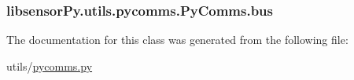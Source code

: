 \subsubsection[{bus}]{\setlength{\rightskip}{0pt plus 5cm}libsensor\+Py.\+utils.\+pycomms.\+Py\+Comms.\+bus}\label{classlibsensorPy_1_1utils_1_1pycomms_1_1PyComms_a06d4a69b8e5b049bb6457af0d987a031}


The documentation for this class was generated from the following file\+:\begin{DoxyCompactItemize}
\item 
utils/\hyperlink{utils_2pycomms_8py}{pycomms.\+py}\end{DoxyCompactItemize}
